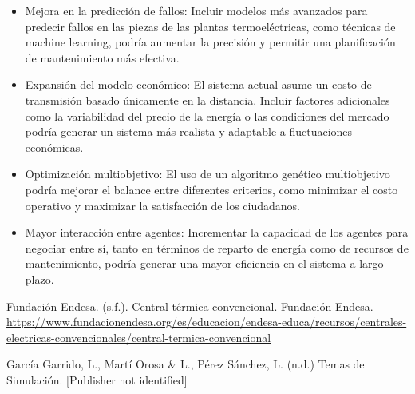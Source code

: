 \documentclass[twocolumn, fontsize=10pt]{article}
\begin{document}
\begin{itemize}
  \item  Mejora en la predicción de fallos: Incluir modelos más avanzados para predecir fallos en las piezas de las plantas termoeléctricas, como técnicas de machine learning, podría aumentar la precisión y permitir una planificación de mantenimiento más efectiva.
     
  
  \item  Expansión del modelo económico: El sistema actual asume un costo de transmisión basado únicamente en la distancia. Incluir factores adicionales como la variabilidad del precio de la energía o las condiciones del mercado podría generar un sistema más realista y adaptable a fluctuaciones económicas.
  
  \item  Optimización multiobjetivo: El uso de un algoritmo genético multiobjetivo podría mejorar el balance entre diferentes criterios, como minimizar el costo operativo y maximizar la satisfacción de los ciudadanos.
  
  \item  Mayor interacción entre agentes: Incrementar la capacidad de los agentes para negociar entre sí, tanto en términos de reparto de energía como de recursos de mantenimiento, podría generar una mayor eficiencia en el sistema a largo plazo.
  
\end{itemize}

\renewcommand\refname{Referencias}

\begin{thebibliography}{}

  \sloppypar
   Fundación Endesa. (s.f.). Central térmica convencional. Fundación Endesa. \url{https://www.fundacionendesa.org/es/educacion/endesa-educa/recursos/centrales-electricas-convencionales/central-termica-convencional}


   García Garrido, L., Martí Orosa \& L., Pérez Sánchez, L. (n.d.) Temas de Simulación. [Publisher not identified]

\end{thebibliography}
    
    
\end{document}
